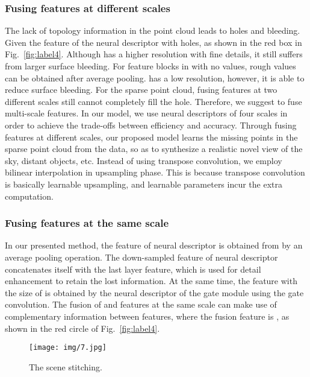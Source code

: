 \documentclass[sigconf]{acmart}
\begin{document}
\subsubsection{Fusing features at different scales}
The lack of topology information in the point cloud leads to holes and bleeding. Given the feature  of the neural descriptor  with holes, as shown in the red box in Fig.~\ref{fig:label4}. Although  has a higher resolution with fine details, it still suffers from larger surface bleeding. For feature blocks in  with no values, rough values can be obtained after average pooling.  has a low resolution, however, it is able to reduce surface bleeding. For the sparse point cloud, fusing features at two different scales still cannot completely fill the hole. Therefore, we suggest  to fuse multi-scale features. In our model, we use neural descriptors of four scales in order to achieve the trade-offs between efficiency and accuracy. Through fusing features at different scales, our proposed model learns the missing points in the sparse point cloud from the data, so as to synthesize a realistic novel view of the sky, distant objects, etc. Instead of using transpose convolution, we employ bilinear interpolation in upsampling phase. This is because transpose convolution is basically learnable upsampling, and learnable parameters incur the extra computation.




\subsubsection{Fusing features at the same scale}
In our presented method, the feature  of neural descriptor  is obtained from  by an average pooling operation. The down-sampled feature  of neural descriptor  concatenates itself with the last  layer feature, which is used for detail enhancement to retain the lost information. At the same time, the feature  with the size of  is obtained by the neural descriptor  of the gate module using the gate convolution. The fusion of  and  features at the same scale can make use of complementary information between features, where the fusion feature is , as shown in the red circle of Fig.~\ref{fig:label4}.






\begin{figure}[h]
\setlength{\abovecaptionskip}{-0.1cm} 
\setlength{\belowcaptionskip}{0pt}
  \centering
  \texttt{[image: img/7.jpg]}
  \caption{The scene stitching.}
    \label{fig:label5}
    \vspace{-0.3cm}
\end{figure}
\end{document}
